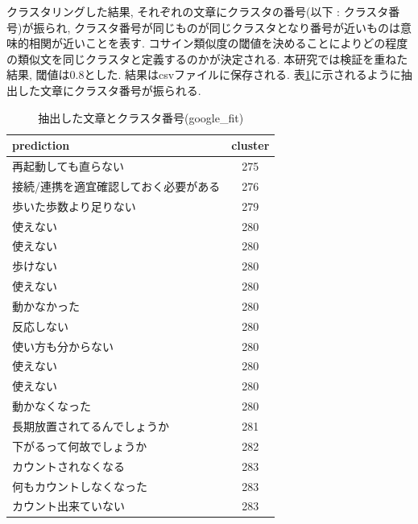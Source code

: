 クラスタリングした結果, それぞれの文章にクラスタの番号(以下 : クラスタ番号)が振られ, クラスタ番号が同じものが同じクラスタとなり番号が近いものは意味的相関が近いことを表す. コサイン類似度の閾値を決めることによりどの程度の類似文を同じクラスタと定義するのかが決定される. 本研究では検証を重ねた結果, 閾値は0.8とした. 
結果はcsvファイルに保存される. 表\ref{tb:clustering}に示されるように抽出した文章にクラスタ番号が振られる. 

\begin{table}[htbp]
  \caption{抽出した文章とクラスタ番号(google\_fit)}
  \label{tb:clustering}
  \begin{center}
  \begin{tabularx}{\linewidth}{|X|c|}
    \hline
    prediction&cluster\\\hline\hline
    再起動しても直らない&275\\\hline
    接続/連携を適宜確認しておく必要がある&276\\\hline
    歩いた歩数より足りない&279\\\hline
    使えない&280\\\hline
    使えない&280\\\hline
    歩けない&280\\\hline
    使えない&280\\\hline
    動かなかった&280\\\hline
    反応しない&280\\\hline
    使い方も分からない&280\\\hline
    使えない&280\\\hline
    使えない&280\\\hline
    動かなくなった&280\\\hline
    長期放置されてるんでしょうか&281\\\hline
    下がるって何故でしょうか&282\\\hline
    カウントされなくなる&283\\\hline
    何もカウントしなくなった&283\\\hline
    カウント出来ていない&283\\\hline
  \end{tabularx}\end{center}
\end{table}

